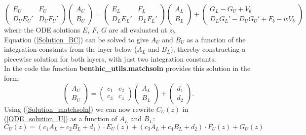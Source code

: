 \documentclass[gmd, manuscript]{copernicus}
\begin{document}
\begin{equation}
 \begin{pmatrix} E_U & F_U \\ D_UE_U' & D_UF_U' \end{pmatrix} \begin{pmatrix} A_U \\ B_U \end{pmatrix} = \begin{pmatrix} E_L & F_L \\ D_LE_L' & D_LF_L' \end{pmatrix} \begin{pmatrix} A_L \\ B_L \end{pmatrix} 
 + \begin{pmatrix} G_L - G_U + V_b \\ D_LG_L' - D_UG_U' + F_b - wV_b\end{pmatrix} \label{Solution_BC}
\end{equation}
where the ODE solutions $E,\ F,\ G$ are all evaluated at $z_b$.\\[1em]
Equation (\ref{Solution_BC}) can be solved to give $A_U$ and $B_U$ as a function of the integration constants from the layer below ($A_L$ and $B_L$), thereby constructing a piecewise solution for both layers, 
with just two integration constants. \\[1em] %
In the code the function \textsf{\textbf{benthic\_utils.matchsoln}} provides this solution in the form:
\begin{equation}
\begin{pmatrix} A_U \\ B_U \end{pmatrix} = \begin{pmatrix} c_1 & c_2 \\ c_3 & c_4 \end{pmatrix} \begin{pmatrix} A_L \\ B_L \end{pmatrix} + \begin{pmatrix} d_1 \\ d_2 \end{pmatrix} . \label{Solution_matchsoln} 
\end{equation}
Using (\ref{Solution_matchsoln}) we can now rewrite $C_U(z)$ in (\ref{ODE_solution_U}) as a function of $A_L$ and $B_L$:
\begin{equation*}
 C_U(z) = (c_1 A_L + c_2 B_L + d_1) \cdot E_U(z) + (c_3 A_L + c_4 B_L + d_2) \cdot F_U(z) + G_U(z) 
\end{equation*}
\end{document}
